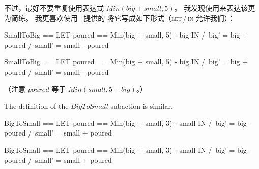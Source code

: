 \begin{ch}
  不过，最好不要重复使用表达式 $Min(big + small, 5)$。
  我发现使用来表达该\tlaaction{}更为简练。
  我更喜欢使用 \tlaplus\ 提供的
  将它写成如下形式（\textsc{let}\,/\,\textsc{in} 允许我们）：
  \medskip
  \begin{twocols}%
  \begin{notla}
  SmallToBig == 
    LET poured == Min(big + small, 5) - big
    IN  /\ big'   = big + poured
	/\ small' = small - poured
  \end{notla}
  \begin{tlatex}
  \end{tlatex}
  \midcol
  \begin{verbatim*}
  SmallToBig == 
    LET poured == Min(big + small, 5) - big
    IN  /\ big'   = big + poured
	/\ small' = small - poured
  \end{verbatim*}
  \end{twocols}
   \medskip
  （注意 $poured$ 等于 $Min(small, 5-big)$。）
\end{ch}
\begin{en}
The definition of the $BigToSmall$ subaction is similar.
 \medskip
\begin{twocols}
\begin{notla}
BigToSmall == 
  LET poured == Min(big + small, 3) - small
  IN  /\ big'   = big - poured
      /\ small' = small + poured
\end{notla}
\begin{tlatex}
%
%
%
\end{tlatex}
\midcol
\begin{verbatim*}
BigToSmall == 
  LET poured == Min(big + small, 3) - small
  IN  /\ big'   = big - poured
      /\ small' = small + poured
\end{verbatim*}
\end{twocols}
 \medskip
\end{en}
